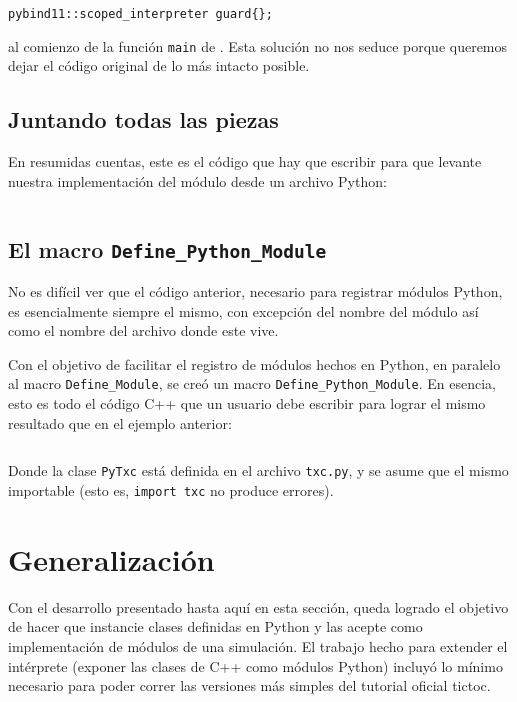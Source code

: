 \begin{verbatim}
pybind11::scoped_interpreter guard{};
\end{verbatim}

\noindent al comienzo de la función \verb!main! de \omnetpp{}.  Esta solución
no nos seduce porque queremos dejar el código original de \omnetpp{} lo más
intacto posible.

\subsection{Juntando todas las piezas}

En resumidas cuentas, este es el código que hay que escribir para que \omnetpp{}
levante nuestra implementación del módulo desde un archivo Python:

\inputminted{c++}{codelistings/omnetpy.cc}

\subsection{El macro \texttt{Define\_Python\_Module}}

No es difícil ver que el código anterior, necesario para registrar módulos
Python, es esencialmente siempre el mismo, con excepción del nombre del módulo
así como el nombre del archivo donde este vive.

Con el objetivo de facilitar el registro de módulos hechos en Python, en
paralelo al macro \verb!Define_Module!, se creó un macro
\verb!Define_Python_Module!. En esencia, esto es todo el código C++ que un
usuario debe escribir para lograr el mismo resultado que en el ejemplo
anterior:

\inputminted{c++}{codelistings/pytxc.cc}

Donde la clase \verb!PyTxc! está definida en el archivo \verb!txc.py!, y se
asume que el mismo importable (esto es, \verb!import txc! no produce errores).

\section{Generalización}

Con el desarrollo presentado hasta aquí en esta sección, queda logrado el
objetivo de hacer que \omnetpp{} instancie clases definidas en Python y las acepte
como implementación de módulos de una simulación. El trabajo hecho para
extender el intérprete (exponer las clases de C++ como módulos Python) incluyó
lo mínimo necesario para poder correr las versiones más simples del tutorial
oficial tictoc. 

